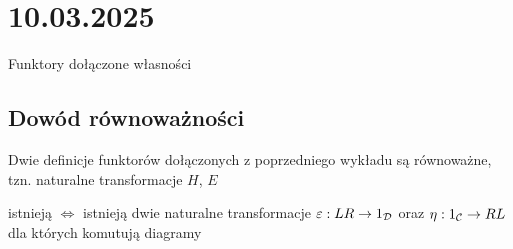 \section{10.03.2025}{Funktory dołączone własności}

\subsection{Dowód równoważności}

\begin{theorem}{}{}
  Dwie definicje funktorów dołączonych z poprzedniego wykładu są równoważne, tzn. naturalne transformacje $H$, $E$
  \begin{center}
  \end{center}
  istnieją $\iff$ istnieją dwie naturalne transformacje $\varepsilon:LR\to 1_{\mathcal{D}}$ oraz $\eta:1_{\mathcal{C}}\to RL$ dla których komutują diagramy
  \begin{center}
  \end{center}
\end{theorem}

